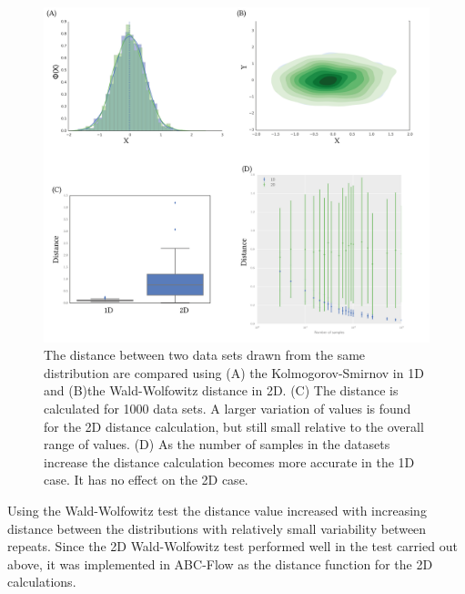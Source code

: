 \begin{figure}[tb]
\centering
\includegraphics[scale=0.7]{../../chapters/chapterABCFlow/images/epsilon_same_box.png}
\caption[LoF caption]{\label{fig:epsilon_boxplt}The distance between two data sets drawn from the same distribution are compared using (A) the Kolmogorov-Smirnov in 1D and (B)the Wald-Wolfowitz distance in 2D. (C) The distance is calculated for 1000 data sets. A larger variation of values is found for the 2D distance calculation, but still small relative to the overall range of values. (D) As the number of samples in the datasets increase the distance calculation becomes more accurate in the 1D case. It has no effect on the 2D case.}
\end{figure}


Using the Wald-Wolfowitz test the distance value increased with increasing distance between the distributions with relatively small variability between repeats. Since the 2D Wald-Wolfowitz test performed well in the test carried out above, it was implemented in ABC-Flow as the distance function for the 2D calculations.


